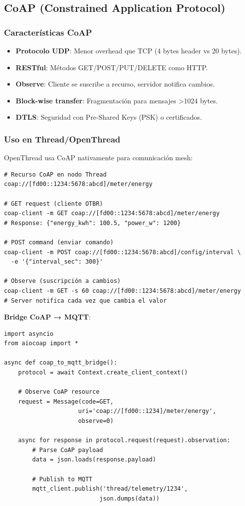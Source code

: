 \subsection{CoAP (Constrained Application Protocol)}

\subsubsection{Características CoAP}

\begin{itemize}
    \item \textbf{Protocolo UDP}: Menor overhead que TCP (4 bytes header vs 20 bytes).
    \item \textbf{RESTful}: Métodos GET/POST/PUT/DELETE como HTTP.
    \item \textbf{Observe}: Cliente se suscribe a recurso, servidor notifica cambios.
    \item \textbf{Block-wise transfer}: Fragmentación para mensajes >1024 bytes.
    \item \textbf{DTLS}: Seguridad con Pre-Shared Keys (PSK) o certificados.
\end{itemize}

\subsubsection{Uso en Thread/OpenThread}

OpenThread usa CoAP nativamente para comunicación mesh:

\begin{verbatim}
# Recurso CoAP en nodo Thread
coap://[fd00::1234:5678:abcd]/meter/energy

# GET request (cliente OTBR)
coap-client -m GET coap://[fd00::1234:5678:abcd]/meter/energy
# Response: {"energy_kwh": 100.5, "power_w": 1200}

# POST command (enviar comando)
coap-client -m POST coap://[fd00::1234:5678:abcd]/config/interval \
  -e '{"interval_sec": 300}'

# Observe (suscripción a cambios)
coap-client -m GET -s 60 coap://[fd00::1234:5678:abcd]/meter/energy
# Server notifica cada vez que cambia el valor
\end{verbatim}

\textbf{Bridge CoAP → MQTT}:
\begin{verbatim}
import asyncio
from aiocoap import *

async def coap_to_mqtt_bridge():
    protocol = await Context.create_client_context()
    
    # Observe CoAP resource
    request = Message(code=GET, 
                     uri='coap://[fd00::1234]/meter/energy',
                     observe=0)
    
    async for response in protocol.request(request).observation:
        # Parse CoAP payload
        data = json.loads(response.payload)
        
        # Publish to MQTT
        mqtt_client.publish('thread/telemetry/1234', 
                           json.dumps(data))
\end{verbatim}

